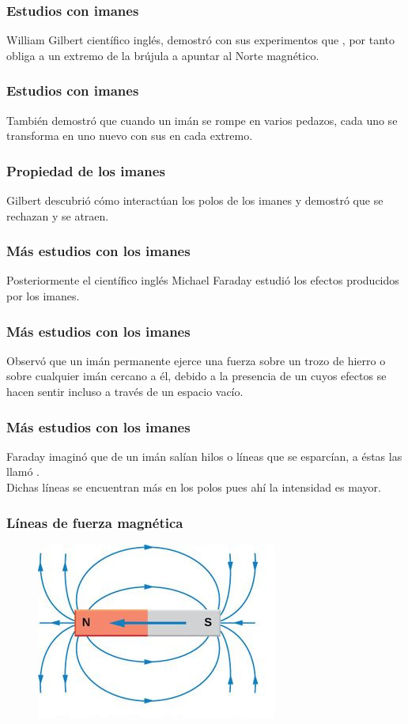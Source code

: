 \documentclass[14pt]{beamer}
\begin{document}
\begin{frame}
\frametitle{Estudios con imanes}
William Gilbert científico inglés, demostró con sus experimentos que , por tanto obliga a un extremo de la brújula a apuntar al Norte magnético.
\end{frame}
\begin{frame}
\frametitle{Estudios con imanes}    
También demostró que cuando un imán se rompe en varios pedazos, cada uno se transforma en uno nuevo con sus  en cada extremo.
\end{frame}
\begin{frame}
\frametitle{Propiedad de los imanes}
Gilbert descubrió cómo interactúan los polos de los imanes y demostró que  se rechazan \pause y  se atraen.
\end{frame}
\begin{frame}
\frametitle{Más estudios con los imanes}
Posteriormente el científico inglés Michael Faraday estudió los efectos producidos por los imanes.
\end{frame}
\begin{frame}
\frametitle{Más estudios con los imanes}    
Observó que un imán permanente ejerce una fuerza sobre un trozo de hierro o sobre cualquier imán cercano a él, \pause debido a la presencia de un  cuyos efectos se hacen sentir incluso a través de un espacio vacío.
\end{frame}
\begin{frame}
\frametitle{Más estudios con los imanes}    
Faraday imaginó que de un imán salían hilos o líneas que se esparcían, \pause a éstas las llamó .
\\
\bigskip
\pause
Dichas líneas se encuentran más en los polos pues ahí la intensidad es mayor.
\end{frame}
\begin{frame}
\frametitle{Líneas de fuerza magnética}
\begin{figure}
    \centering
    \includegraphics[scale=1]{Imagenes/Magnetismo_03a.jpg}
\end{figure}
\end{frame}
\end{document}
